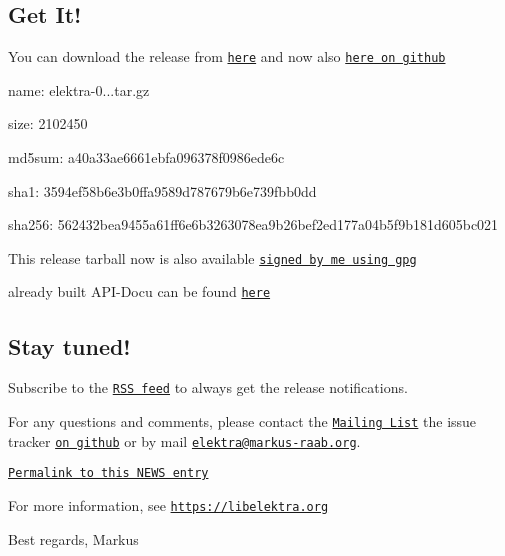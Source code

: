 \subsection*{Get It!}

You can download the release from \href{https://www.libelektra.org/ftp/elektra/releases/elektra-0.8.12.tar.gz}{\tt here} and now also \href{https://github.com/ElektraInitiative/ftp/tree/master/releases/elektra-0.8.12.tar.gz}{\tt here on github}


\begin{DoxyItemize}
\item name\+: elektra-\/0...\+tar.\+gz
\item size\+: 2102450
\item md5sum\+: a40a33ae6661ebfa096378f0986ede6c
\item sha1\+: 3594ef58b6e3b0ffa9589d787679b6e739fbb0dd
\item sha256\+: 562432bea9455a61ff6e6b3263078ea9b26bef2ed177a04b5f9b181d605bc021
\end{DoxyItemize}

This release tarball now is also available \href{https://www.libelektra.org/ftp/elektra/releases/elektra-0.8.12.tar.gz.gpg}{\tt signed by me using gpg}

already built A\+P\+I-\/\+Docu can be found \href{https://doc.libelektra.org/api/0.8.12/html/}{\tt here}

\subsection*{Stay tuned!}

Subscribe to the \href{https://doc.libelektra.org/news/feed.rss}{\tt R\+SS feed} to always get the release notifications.

For any questions and comments, please contact the \href{https://lists.sourceforge.net/lists/listinfo/registry-list}{\tt Mailing List} the issue tracker \href{https://git.libelektra.org/issues}{\tt on github} or by mail \href{mailto:elektra@markus-raab.org}{\tt elektra@markus-\/raab.\+org}.

\href{https://doc.libelektra.org/news/98770541-32a1-486a-98a1-d02f26afc81a.html}{\tt Permalink to this N\+E\+WS entry}

For more information, see \href{https://libelektra.org}{\tt https\+://libelektra.\+org}

Best regards, Markus 